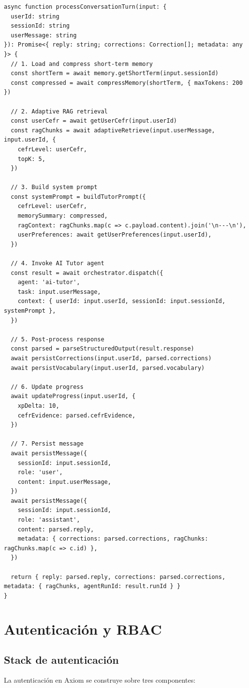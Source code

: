 \documentclass[10pt,a4paper,oneside]{report}
\begin{document}
\begin{lstlisting}[style=ts,caption={Método principal de LIL}]
async function processConversationTurn(input: {
  userId: string
  sessionId: string
  userMessage: string
}): Promise<{ reply: string; corrections: Correction[]; metadata: any }> {
  // 1. Load and compress short-term memory
  const shortTerm = await memory.getShortTerm(input.sessionId)
  const compressed = await compressMemory(shortTerm, { maxTokens: 200 })

  // 2. Adaptive RAG retrieval
  const userCefr = await getUserCefr(input.userId)
  const ragChunks = await adaptiveRetrieve(input.userMessage, input.userId, {
    cefrLevel: userCefr,
    topK: 5,
  })

  // 3. Build system prompt
  const systemPrompt = buildTutorPrompt({
    cefrLevel: userCefr,
    memorySummary: compressed,
    ragContext: ragChunks.map(c => c.payload.content).join('\n---\n'),
    userPreferences: await getUserPreferences(input.userId),
  })

  // 4. Invoke AI Tutor agent
  const result = await orchestrator.dispatch({
    agent: 'ai-tutor',
    task: input.userMessage,
    context: { userId: input.userId, sessionId: input.sessionId, systemPrompt },
  })

  // 5. Post-process response
  const parsed = parseStructuredOutput(result.response)
  await persistCorrections(input.userId, parsed.corrections)
  await persistVocabulary(input.userId, parsed.vocabulary)

  // 6. Update progress
  await updateProgress(input.userId, {
    xpDelta: 10,
    cefrEvidence: parsed.cefrEvidence,
  })

  // 7. Persist message
  await persistMessage({
    sessionId: input.sessionId,
    role: 'user',
    content: input.userMessage,
  })
  await persistMessage({
    sessionId: input.sessionId,
    role: 'assistant',
    content: parsed.reply,
    metadata: { corrections: parsed.corrections, ragChunks: ragChunks.map(c => c.id) },
  })

  return { reply: parsed.reply, corrections: parsed.corrections, metadata: { ragChunks, agentRunId: result.runId } }
}
\end{lstlisting}

\chapter{Autenticación y RBAC}

\section{Stack de autenticación}
La autenticación en Axiom se construye sobre tres componentes:
\end{document}
